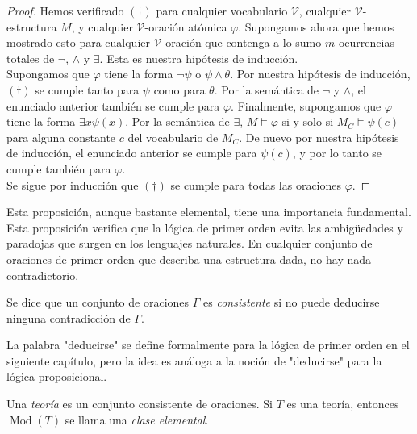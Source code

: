 \documentclass[12pt,a4paper]{book}
\newcommand{\comillas}[1]{"#1"}
\newcommand{\VV}{\mathcal{V}}
\DeclareMathOperator{\Mod}{Mod}
\begin{document}
\begin{proof}
        Hemos verificado $(\dagger)$ para cualquier vocabulario $\VV$, cualquier $\VV$-estructura $M$, y cualquier
        $\VV$-oración atómica $\varphi$. Supongamos ahora que hemos mostrado esto para cualquier $\VV$-oración que
        contenga a lo sumo $m$ ocurrencias totales de $\neg$, $\wedge$ y $\exists$. Esta es nuestra hipótesis de
        inducción.\\
        Supongamos que $\varphi$ tiene la forma $\neg\psi$ o $\psi\wedge\theta$. Por nuestra hipótesis de inducción,
        $(\dagger)$ se cumple tanto para $\psi$ como para $\theta$. Por la semántica de $\neg$ y $\wedge$, el enunciado
        anterior también se cumple para $\varphi$. Finalmente, supongamos que $\varphi$ tiene la forma $\exists x\psi(x)$.
        Por la semántica de $\exists$, $M\models\varphi$ si y solo si $M_{C}\models\psi(c)$ para alguna constante $c$ del
        vocabulario de $M_{C}$. De nuevo por nuestra hipótesis de inducción, el enunciado anterior se cumple para
        $\psi(c)$, y por lo tanto se cumple también para $\varphi$.\\
        Se sigue por inducción que $(\dagger)$ se cumple para todas las oraciones $\varphi$.
    \end{proof}

    Esta proposición, aunque bastante elemental, tiene una importancia fundamental. Esta proposición verifica que la
    lógica de primer orden evita las ambigüedades y paradojas que surgen en los lenguajes naturales. En cualquier conjunto
    de oraciones de primer orden que describa una estructura dada, no hay nada contradictorio.

    \begin{definicion}[Consistente]\label{def:consistente}
        Se dice que un conjunto de oraciones $\Gamma$ es \textit{consistente} si no puede deducirse ninguna contradicción
        de $\Gamma$.
    \end{definicion}

    La palabra \comillas{deducirse} se define formalmente para la lógica de primer orden en el siguiente capítulo, pero la
    idea es análoga a la noción de \comillas{deducirse} para la lógica proposicional.

    \begin{definicion}[Teoría]\label{def:teoria-clase-elemental}
        Una \textit{teoría} es un conjunto consistente de oraciones. Si $T$ es una teoría, entonces $\Mod(T)$ se llama
        una \textit{clase elemental}.
    \end{definicion}
\end{document}
